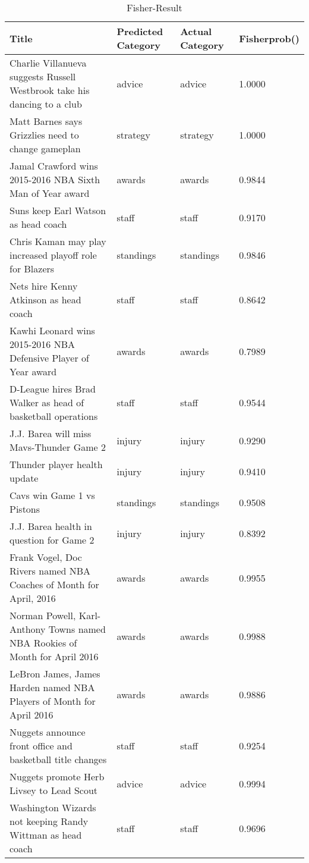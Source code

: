\begin{table}[!htbp]
\caption{Fisher-Result} \label{tab:fisher-result}
\begin{center}
\scriptsize
\vspace{-5mm}
\hspace{-18mm}
\begin{tabular}{ l l l l}
\hline
Title & Predicted Category & Actual Category & Fisherprob()\\
\hline
Charlie Villanueva suggests Russell Westbrook take his dancing to a club & advice & advice & 1.0000\\
Matt Barnes says Grizzlies need to change gameplan & strategy & strategy & 1.0000\\
Jamal Crawford wins 2015-2016 NBA Sixth Man of Year award & awards & awards & 0.9844\\
Suns keep Earl Watson as head coach & staff & staff & 0.9170\\
Chris Kaman may play increased playoff role for Blazers & standings & standings & 0.9846\\
Nets hire Kenny Atkinson as head coach & staff & staff & 0.8642\\
Kawhi Leonard wins 2015-2016 NBA Defensive Player of Year award & awards & awards & 0.7989\\
D-League hires Brad Walker as head of basketball operations & staff & staff & 0.9544\\
J.J. Barea will miss Mavs-Thunder Game 2 & injury & injury & 0.9290\\
Thunder player health update & injury & injury & 0.9410\\
Cavs win Game 1 vs Pistons & standings & standings & 0.9508\\
J.J. Barea health in question for Game 2 & injury & injury & 0.8392\\
Frank Vogel, Doc Rivers named NBA Coaches of Month for April, 2016 & awards & awards & 0.9955\\
Norman Powell, Karl-Anthony Towns named NBA Rookies of Month for April 2016 & awards & awards & 0.9988\\
LeBron James, James Harden named NBA Players of Month for April 2016 & awards & awards & 0.9886\\
Nuggets announce front office and basketball title changes & staff & staff & 0.9254\\
Nuggets promote Herb Livsey to Lead Scout & advice & advice & 0.9994\\
Washington Wizards not keeping Randy Wittman as head coach & staff & staff & 0.9696\\

\end{tabular}
\end{center}
\end{table}
